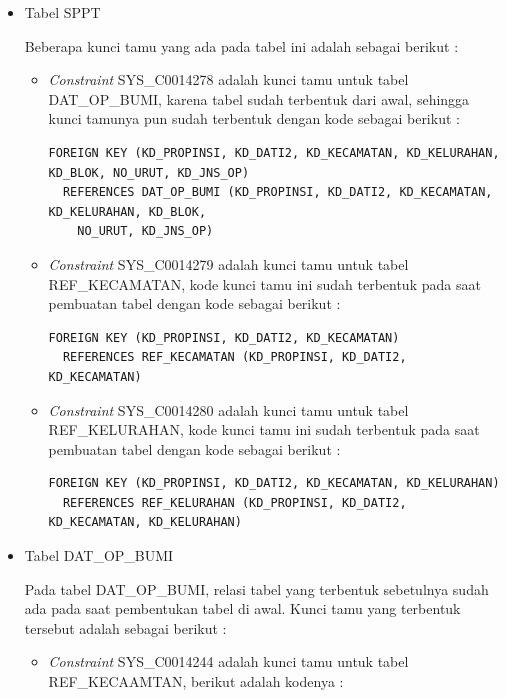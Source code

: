 \documentclass[pdftex,12pt, oneside]{article}
\begin{document}
\begin{enumerate}[1.]
	\begin{itemize}
	\item Tabel SPPT
	
	Beberapa kunci tamu yang ada pada tabel ini adalah sebagai berikut :
	
		\begin{itemize}
			\item \textit{Constraint} SYS\_C0014278 adalah kunci tamu untuk tabel DAT\_OP\_BUMI, karena tabel sudah terbentuk dari awal, sehingga kunci tamunya pun sudah terbentuk dengan kode sebagai berikut :
	
\begin{lstlisting}
FOREIGN KEY (KD_PROPINSI, KD_DATI2, KD_KECAMATAN, KD_KELURAHAN, KD_BLOK, NO_URUT, KD_JNS_OP)
  REFERENCES DAT_OP_BUMI (KD_PROPINSI, KD_DATI2, KD_KECAMATAN, KD_KELURAHAN, KD_BLOK, 
    NO_URUT, KD_JNS_OP)
\end{lstlisting}

			\item \textit{Constraint} SYS\_C0014279 adalah kunci tamu untuk tabel REF\_KECAMATAN, kode kunci tamu ini sudah terbentuk pada saat pembuatan tabel dengan kode sebagai berikut :
	
\begin{lstlisting}
FOREIGN KEY (KD_PROPINSI, KD_DATI2, KD_KECAMATAN) 
  REFERENCES REF_KECAMATAN (KD_PROPINSI, KD_DATI2, KD_KECAMATAN)
\end{lstlisting}
	
			\item \textit{Constraint} SYS\_C0014280 adalah kunci tamu untuk tabel REF\_KELURAHAN, kode kunci tamu ini sudah terbentuk pada saat pembuatan tabel dengan kode sebagai berikut :
	
\begin{lstlisting}
FOREIGN KEY (KD_PROPINSI, KD_DATI2, KD_KECAMATAN, KD_KELURAHAN)
  REFERENCES REF_KELURAHAN (KD_PROPINSI, KD_DATI2, KD_KECAMATAN, KD_KELURAHAN)
\end{lstlisting}
		\end{itemize}
	
	\item Tabel DAT\_OP\_BUMI
	
	Pada tabel DAT\_OP\_BUMI, relasi tabel yang terbentuk sebetulnya sudah ada pada saat pembentukan tabel di awal. Kunci tamu yang terbentuk tersebut adalah sebagai berikut :
	
		\begin{itemize}
			\item \textit{Constraint} SYS\_C0014244 adalah kunci tamu untuk tabel REF\_KECAAMTAN,  berikut adalah kodenya :
			

\end{itemize}
\end{itemize}
\end{enumerate}
\end{document}
